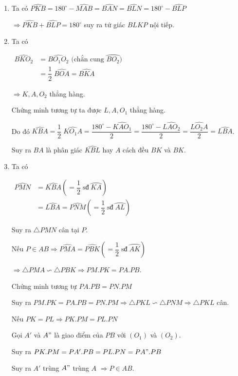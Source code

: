 \begin{ex}
{\begin{center}
\begin{tikzpicture}
\end{tikzpicture}
\end{center}

\begin{enumerate}
\item Ta có $
\widehat{PKB} = 180^\circ - \widehat{MAB}= \widehat{BAN} = \widehat{BLN} = 180^\circ - \widehat{BLP}
$

$\Rightarrow \widehat{PKB} + \widehat{BLP} = 180^\circ$ suy ra tứ giác $BLKP$ nội tiếp.
\item Ta có 

$
\begin{aligned}
\widehat{BKO_2} & =  \widehat{BO_1O_2} \mbox{ (chắn cung }\wideparen{BO_2})\\
& = \dfrac{1}{2}\;\widehat{BOA} = \widehat{BKA}
\end{aligned}
$

$\Rightarrow K, A, O_2$ thẳng hàng.

Chứng minh tương tự ta được $L, A, O_1$ thẳng hàng.

Do đó $\widehat{KBA} = \dfrac{1}{2}\;\widehat{KO_1A} = \dfrac{180^\circ - \widehat{KAO_1}}{2}=  \dfrac{180^\circ - \widehat{LAO_2}}{2} =\dfrac{\widehat{LO_2A}}{2} = \widehat{LBA}$.

Suy ra $BA$ là phân giác $\widehat{KBL}$ hay $A$ cách đều $BK$ và $BK$.
\item Ta có 

$
			\begin{aligned}
			\widehat{PMN}&= \widehat{KBA} \left(=\dfrac{1}{2}\;\mbox{sđ}\;\wideparen{KA}\right)\\
			& = \widehat{LBA} = \widehat{PNM}\left(=\dfrac{1}{2}\;\mbox{sđ}\;\wideparen{AL}\right) 
			\end{aligned}
			$
			
Suy ra $\triangle PMN$ cân tại $P$.

Nếu $P\in AB \Rightarrow \widehat{PMA} = \widehat{PBK}  \left(=\dfrac{1}{2}\;\mbox{sđ}\;\wideparen{AK}\right) $

$\Rightarrow \triangle PMA \backsim \triangle PBK \Rightarrow PM.PK = PA.PB$.

Chứng minh tương tự $PA.PB = PN.PM$

Suy ra $PM.PK = PA.PB = PN.PM \Rightarrow \triangle PKL \backsim \triangle PNM \Rightarrow \triangle PKL$ cân.

Nếu $PK = PL \Rightarrow PK.PM = PL.PN$

Gọi $A'$ và $A"$ là giao điểm của $PB$ với $(O_1)$ và $(O_2)$.

Suy ra $PK.PM = PA'.PB = PL.PN = PA".PB$

Suy ra $A'$ trùng $A"$ trùng $A$ $\Rightarrow P\in AB$. 
\end{enumerate}
}
\end{ex}

